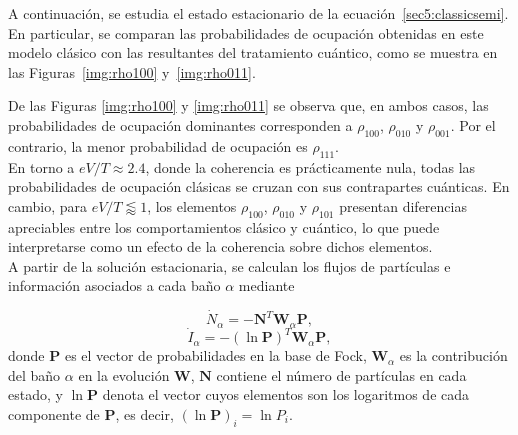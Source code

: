 A continuación, se estudia el estado estacionario de la ecuación~\eqref{sec5:classicsemi}. En particular, se comparan las probabilidades de ocupación obtenidas en este modelo clásico con las resultantes del tratamiento cuántico, como se muestra en las Figuras~\ref{img:rho100} y~\ref{img:rho011}. 


De las Figuras \ref{img:rho100} y \ref{img:rho011} se observa que, en ambos casos, las probabilidades de ocupación dominantes corresponden a $\rho_{100}$, $\rho_{010}$ y $\rho_{001}$. Por el contrario, la menor probabilidad de ocupación es $\rho_{111}$.
\\

En torno a $eV/T \approx 2.4$, donde la coherencia es prácticamente nula, todas las probabilidades de ocupación clásicas se cruzan con sus contrapartes cuánticas. En cambio, para $eV/T \lessapprox 1$, los elementos $\rho_{100}$, $\rho_{010}$ y $\rho_{101}$ presentan diferencias apreciables entre los comportamientos clásico y cuántico, lo que puede interpretarse como un efecto de la coherencia sobre dichos elementos.
\\

A partir de la solución estacionaria, se calculan los flujos de partículas e información asociados a cada baño $\alpha$ mediante

\begin{equation}
    \dot{N}_{\alpha} = -\mathbf{N}^{T} \mathbf{W}_{\alpha}\mathbf{P},
    \label{sec5:currentsemi}
\end{equation}
\begin{equation}
    \dot{I}_{\alpha} = -(\ln \mathbf{P})^{T} \mathbf{W}_{\alpha}\mathbf{P},
    \label{sec5:infosemi}
\end{equation}
donde $\mathbf{P}$ es el vector de probabilidades en la base de Fock, $\mathbf{W}_{\alpha}$ es la contribución del baño $\alpha$ en la evolución $\mathbf{W}$, $\mathbf{N}$ contiene el número de partículas en cada estado, y $\ln \mathbf{P}$ denota el vector cuyos elementos son los logaritmos de cada componente de $\mathbf{P}$, es decir, $(\ln \mathbf{P})_i = \ln P_i$\cite{monsel2025autonomous}.
\\

